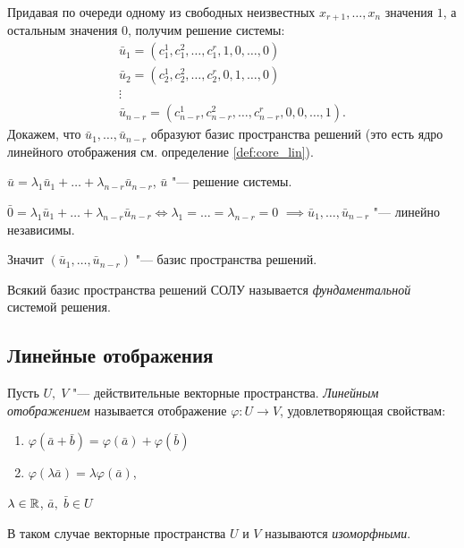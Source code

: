 Придавая по очереди одному из свободных неизвестных $x_{r + 1}, \ldots, x_n$ значения $1$, а остальным значения $0$, получим решение системы:
$$
\begin{array}{l}
    \bar{u}_1 = (c_1^1,c_1^2,\ldots,c_1^r,1,0,\ldots,0) \\
    \bar{u}_2 = (c_2^1,c_2^2,\ldots,c_2^r,0,1,\ldots,0) \\
    \vdots \\
    \bar{u}_{n - r} = (c_{n - r}^1, c_{n - r}^2, \ldots, c_{n - r}^r, 0, 0, \ldots, 1).
\end{array}
$$
Докажем, что $\bar{u}_1, \ldots, \bar{u}_{n - r}$ образуют базис пространства решений (это есть ядро линейного отображения см. определение \ref{def:core_lin}).
\begin{Proof}
    $\bar{u} = \lambda_1\bar{u}_1 + \ldots + \lambda_{n - r}\bar{u}_{n - r}$, $\bar{u}$ "--- решение системы.

    $\bar{0} = \lambda_1\bar{u}_1 + \ldots + \lambda_{n - r}\bar{u}_{n - r} \Leftrightarrow \lambda_1 = \ldots = \lambda_{n - r} = 0$
    $\implies \bar{u}_1, \ldots, \bar{u}_{n - r}$ "--- линейно независимы.
    
    Значит $(\bar{u}_1, \ldots, \bar{u}_{n - r})$ "--- базис пространства решений. 
\end{Proof}

\begin{definition}
    Всякий базис пространства решений СОЛУ называется \textit{фундаментальной} системой решения.
\end{definition}

\subsection*{Линейные отображения}
\begin{definition}
    Пусть $U,\;V$ "--- действительные векторные пространства.
    \textit{Линейным отображением} называется отображение $\varphi: U \to V$, удовлетворяющая свойствам:
    \begin{enumerate}
        \item $\varphi(\bar{a} + \bar{b}) = \varphi(\bar{a}) + \varphi(\bar{b})$
        \item $\varphi(\lambda\bar{a}) = \lambda\varphi(\bar{a})$,
    \end{enumerate}
    $\lambda \in \mathbb{R}$, $\bar{a},\;\bar{b} \in U$
    
\end{definition}
В таком случае векторные пространства $U$ и $V$ называются \textit{изоморфными}. 

